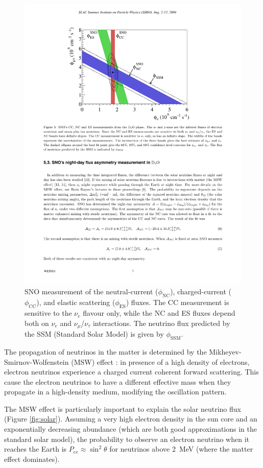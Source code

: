 \begin{figure}[htbp]
    \centering
    \includegraphics[width=0.7\linewidth]{figures/sno_plot.pdf}
    \caption{SNO measurement of the neutral-current ($\phi_{\mathrm{NC}}$), charged-current ($\phi_{\mathrm{CC}}$), and elastic scattering ($\phi_{\mathrm{ES}}$) fluxes. The CC measurement is sensitive to the $\nu_e$ flavour only, while the NC and ES fluxes depend both on $\nu_e$ and $\nu_{\mu}$/$\nu_{\tau}$ interactions. The neutrino flux predicted by the SSM (Standard Solar Model) is given by $\phi_{\mathrm{SSM}}$.}
    \label{fig:sno}
\end{figure}

The propagation of neutrinos in the matter is determined by the Mikheyev-Smirnov-Wolfenstein (MSW) effect \cite{Wolfenstein:1977ue}: in presence of a high density of electrons, electron neutrinos experience a charged current coherent forward scattering. This cause the electron neutrinos to have a different effective mass when they propagate in a high-density medium, modifying the oscillation pattern. 

The MSW effect is particularly important to explain the solar neutrino flux (Figure \ref{fig:solar}). Assuming a very high electron density in the sun core and an exponentially decreasing abundance (which are both good approximations in the standard solar model), the probability to observe an electron neutrino when it reaches the Earth is $P_{ee} \approx \sin^2\theta$ for neutrinos above 2~MeV (where the matter effect dominates).


